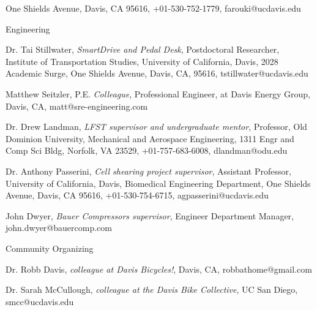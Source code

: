 \documentclass[10pt]{article}
\newenvironment{outerlist}[1][\enskip\textbullet]%
        {\begin{itemize}[#1]}{\end{itemize}%
         \vspace{-.6\baselineskip}}
\newenvironment{innerlist}[1][\enskip\textbullet]%
        {\begin{compactitem}[#1]}{\end{compactitem}}
\begin{document}
\begin{outerlist}
\begin{innerlist}
        One Shields Avenue, Davis, CA 95616,
        +01-530-752-1779,
        farouki@ucdavis.edu
    \end{innerlist}
  \item[] Engineering
    \begin{innerlist}
      \item Dr. Tai Stillwater,
        \emph{SmartDrive and Pedal Desk},
        Postdoctoral Researcher,
        Institute of Transportation Studies,
        University of California, Davis,
        2028 Academic Surge, One Shields Avenue, Davis, CA, 95616,
        tstillwater@ucdavis.edu
      \item Matthew Seitzler, P.E. \emph{Colleague},
        Professional Engineer, at Davis Energy Group, Davis, CA,
        matt@sre-engineering.com
      \item Dr. Drew Landman,
        \emph{LFST supervisor and undergraduate mentor},
        Professor,
        Old Dominion University,
        Mechanical and Aerospace Engineering,
        1311 Engr and Comp Sci Bldg, Norfolk, VA 23529,
        +01-757-683-6008,
        dlandman@odu.edu
      \item Dr. Anthony Passerini,
        \emph{Cell shearing project supervisor},
        Assistant Professor,
        University of California, Davis,
        Biomedical Engineering Department,
        One Shields Avenue, Davis, CA 95616,
        +01-530-754-6715,
        agpasserini@ucdavis.edu
      \item John Dwyer,
        \emph{Bauer Compressors supervisor},
        Engineer Department Manager,
        john.dwyer@bauercomp.com
    \end{innerlist}
  \item[] Community Organizing
    \begin{innerlist}
      \item Dr. Robb Davis,
        \emph{colleague at Davis Bicycles!},
        Davis, CA,
        robbathome@gmail.com
      \item Dr. Sarah McCullough,
        \emph{colleague at the Davis Bike Collective},
        UC San Diego,
        smcc@ucdavis.edu
    \end{innerlist}
\end{outerlist}
%
\end{document}
